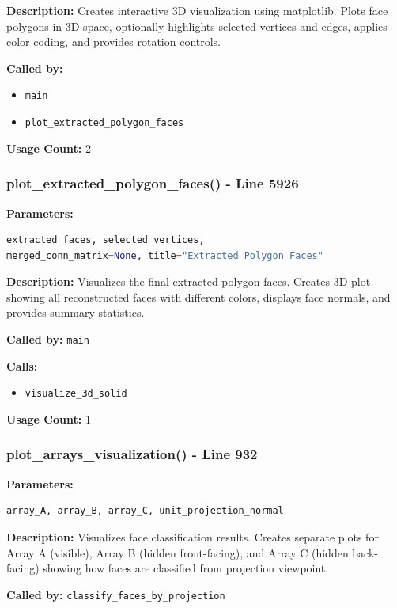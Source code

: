 \documentclass[11pt,a4paper]{article}
\begin{document}
\textbf{Description:}
Creates interactive 3D visualization using matplotlib. Plots face polygons in 3D space, optionally highlights selected vertices and edges, applies color coding, and provides rotation controls.

\textbf{Called by:} 
\begin{itemize}
    \item \texttt{main}
    \item \texttt{plot\_extracted\_polygon\_faces}
\end{itemize}

\textbf{Usage Count:} 2

\subsubsection{plot\_extracted\_polygon\_faces() - Line 5926}
\textbf{Parameters:}
\begin{lstlisting}[language=Python]
extracted_faces, selected_vertices, 
merged_conn_matrix=None, title="Extracted Polygon Faces"
\end{lstlisting}

\textbf{Description:}
Visualizes the final extracted polygon faces. Creates 3D plot showing all reconstructed faces with different colors, displays face normals, and provides summary statistics.

\textbf{Called by:} \texttt{main}

\textbf{Calls:}
\begin{itemize}
    \item \texttt{visualize\_3d\_solid}
\end{itemize}

\textbf{Usage Count:} 1

\subsubsection{plot\_arrays\_visualization() - Line 932}
\textbf{Parameters:}
\begin{lstlisting}[language=Python]
array_A, array_B, array_C, unit_projection_normal
\end{lstlisting}

\textbf{Description:}
Visualizes face classification results. Creates separate plots for Array A (visible), Array B (hidden front-facing), and Array C (hidden back-facing) showing how faces are classified from projection viewpoint.

\textbf{Called by:} \texttt{classify\_faces\_by\_projection}
\end{document}
